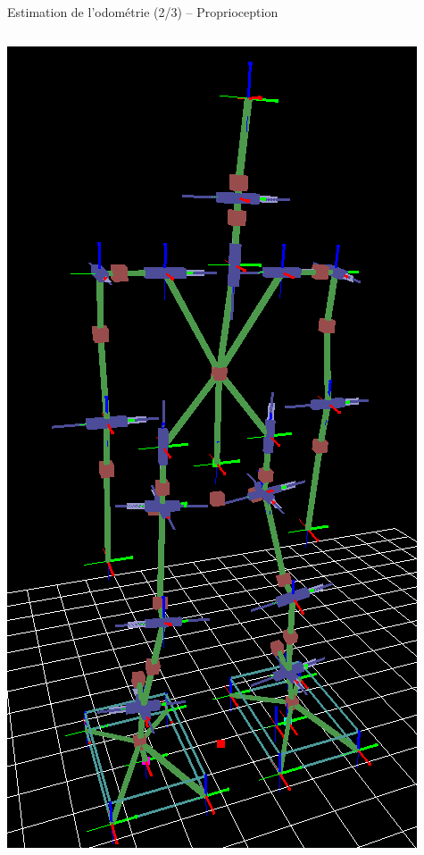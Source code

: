 \begin{frame}{Estimation de l'odométrie (2/3) -- Proprioception}
\begin{columns}
\begin{column}{0.5\linewidth}
            \includegraphics[height=0.85\textheight]{../media/model_gui1.png}
        \end{column}
    \end{columns}
\end{frame}

